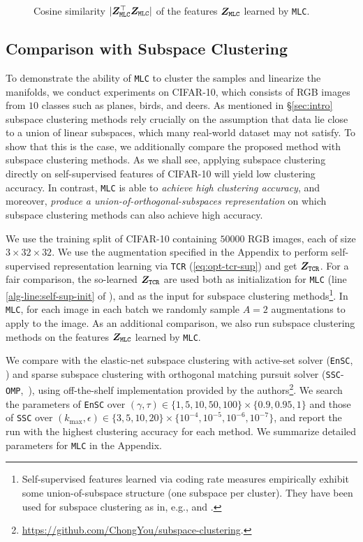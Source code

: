 \documentclass[10pt,twocolumn,letterpaper]{article}
\newcommand{\ours}{MLC}
\newcommand{\mours}{\texttt{\ours}}
\begin{document}
\begin{figure}[t!]
\begin{minipage}[b]{0.32\textwidth}
      \caption{Cosine similarity $|\mZ_{\text{\mours}}^\top \mZ_{\text{\mours}}|$ of the features $\mZ_{\text{\mours}}$ learned by \mours{}.}\label{fig:cifar10-ztz}
    \end{minipage}
  \end{figure}

   \subsection{Comparison with Subspace Clustering} \label{sec:exp-sc}
   To demonstrate the ability of \mours{} to cluster the samples and linearize the manifolds, we conduct experiments on CIFAR-10, which consists of RGB images from $10$ classes such as planes, birds, and deers. As mentioned in \S \ref{sec:intro} subspace clustering methods rely crucially on the assumption that data lie close to a union of linear subspaces, which many real-world dataset may not satisfy. To show that this is the case, we additionally compare the proposed method with subspace clustering methods. As we shall see, applying subspace clustering directly on self-supervised features of CIFAR-10 will yield low clustering accuracy. In contrast, \mours{} is able to \textit{achieve high clustering accuracy}, and moreover, \textit{produce a union-of-orthogonal-subspaces representation} on which subspace clustering methods can also achieve high accuracy. 
   
    We use the training split of CIFAR-10 containing $50000$ RGB images, each of size $3\times 32\times 32$. We use the augmentation specified in the Appendix
   to perform self-supervised representation learning via \texttt{TCR} (\ref{eq:opt-tcr-sup}) and get ${\bm{Z}}_{\text{\texttt{TCR}}}$. For a fair comparison, the so-learned ${\bm{Z}}_{\text{\texttt{TCR}}}$ are used both as initialization for \mours{} (line \ref{alg-line:self-sup-init} of ), and as the input for subspace clustering methods\footnote{Self-supervised features learned via coding rate measures empirically exhibit some union-of-subspace structure (one subspace per cluster). They have been used for subspace clustering as in, e.g., \cite[\S 3.2]{Yu2020-mx} and \cite[\S 4.2]{Zhang2021-sx}. }. In \mours{}, for each image in each batch we randomly sample $A=2$ augmentations to apply to the image. As an additional comparison, we also run subspace clustering methods on the features $\mZ_{\text{\mours}}$ learned by \mours.
   
    We compare with the elastic-net subspace clustering with active-set solver (\texttt{EnSC}, \cite{You2016-ob}) and sparse subspace clustering with orthogonal matching pursuit solver (\texttt{SSC}-\texttt{OMP},~\cite{You2016-na}), using off-the-shelf implementation provided by the authors\footnote{\scriptsize\url{https://github.com/ChongYou/subspace-clustering}.}. We search the parameters of \texttt{EnSC} over $(\gamma,\tau)\in\{1,5,10,50,100\}\times\{0.9,0.95,1\}$ and those of \texttt{SSC} over $(k_{\mathrm{max}},\epsilon)\in\{3,5,10,20\}\times\{10^{-4},10^{-5},10^{-6},10^{-7}\}$, and report the run with the highest clustering accuracy for each method. 
   We summarize detailed parameters for \mours{} in the Appendix.
   
\end{document}
